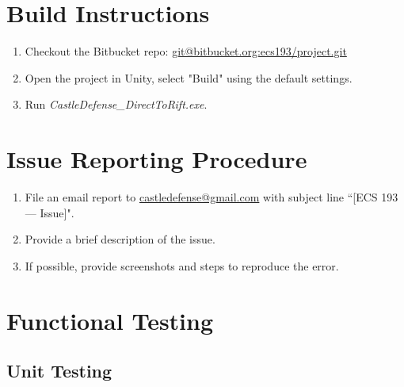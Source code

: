 \section{Build Instructions}

\begin{enumerate}
	\item Checkout the Bitbucket repo: \url{git@bitbucket.org:ecs193/project.git}
	\item Open the project in Unity, select "Build" using the default settings.
	\item Run \textit{CastleDefense\_DirectToRift.exe}.
\end{enumerate}

\section{Issue Reporting Procedure}

\begin{enumerate}
	\item File an email report to \url{castledefense@gmail.com} with subject line ``[ECS 193 --- Issue]".
	\item Provide a brief description of the issue.
	\item If possible, provide screenshots and steps to reproduce the error.
\end{enumerate}

\section{Functional Testing}

\subsection{Unit Testing}

